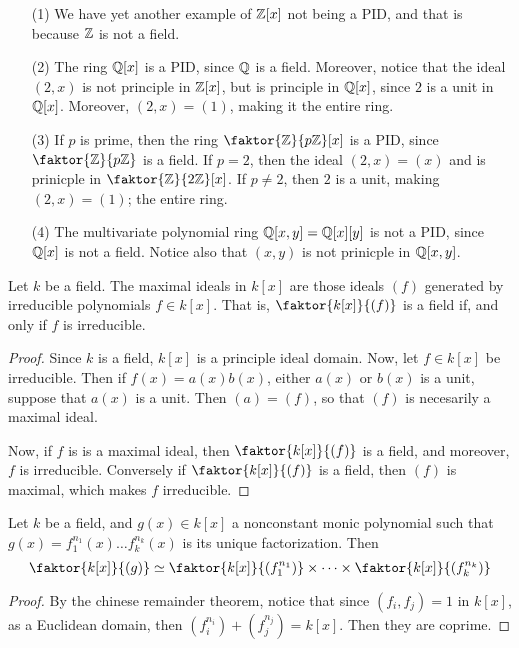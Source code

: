 \begin{example}\label{example_7.7}
  \begin{enumerate}
    \item[(1)] We have yet another example of $\mathbb{Z}[x]$ not being a PID, and
      that is because $\mathbb{Z}$ is not a field.

    \item[(2)] The ring $\mathbb{Q}[x]$ is a PID, since $\mathbb{Q}$ is a field. Moreover,
      notice that the ideal $(2,x)$ is not principle in $\mathbb{Z}[x]$, but is
      principle in $\mathbb{Q}[x]$, since $2$ is a unit in  $\mathbb{Q}[x]$. Moreover,
      $(2,x)=(1)$, making it the entire ring.

    \item[(3)] If $p$ is prime, then the ring  $\faktor{\Z}{p\Z}[x]$ is a
      PID, since $\faktor{\Z}{p\Z}$ is a field. If $p=2$, then the ideal
      $(2,x)=(x)$ and is prinicple in $\faktor{\Z}{2\Z}[x]$. If $p \neq 2$,
      then  $2$ is a unit, making  $(2,x)=(1)$; the entire ring.

    \item[(4)] The multivariate polynomial ring $\mathbb{Q}[x,y]=\mathbb{Q}[x][y]$ is not a
      PID, since $\mathbb{Q}[x]$ is not a field. Notice also that $(x,y)$ is not
      prinicple in $\mathbb{Q}[x,y]$.
  \end{enumerate}
\end{example}

\begin{lemma}\label{lemma_7.4.2}
  Let $k$ be a field. The maximal ideals in $k[x]$ are those ideals $(f)$
  generated by irreducible polynomials $f \in k[x]$. That is,
  $\faktor{k[x]}{(f)}$ is a field if, and only if $f$ is irreducible.
\end{lemma}
\begin{proof}
  Since $k$ is a field, $k[x]$ is a principle ideal domain. Now, let
  $f \in k[x]$ be irreducible. Then if $f(x)=a(x)b(x)$, either
  $a(x)$ or $b(x)$ is a unit, suppose that $a(x)$ is a unit. Then
  $(a)=(f)$, so that $(f)$ is necesarily a maximal ideal.

  Now, if $f$ is is a maximal ideal, then $\faktor{k[x]}{(f)}$ is a
  field, and moreover, $f$ is irreducible. Conversely if
  $\faktor{k[x]}{(f)}$ is a field, then $(f)$ is maximal, which makes
  $f$ irreducible.
\end{proof}

\begin{lemma}\label{lemma_7.4.4}
  Let $k$ be a field, and  $g(x) \in k[x]$ a nonconstant monic polynomial such
  that $g(x)=f_1^{n_1}(x) \dots f_k^{n_k}(x)$ is its unique factorization.
  Then
  \begin{equation*}
    \faktor{k[x]}{(g)} \simeq \faktor{k[x]}{(f_1^{n_1})} \times
    \dots \times \faktor{k[x]}{(f_k^{n_k})}
  \end{equation*}
\end{lemma}
\begin{proof}
  By the chinese remainder theorem, notice that since $(f_i,f_j)=1$ in $k[x]$,
  as a Euclidean domain, then $(f_i^{n_i})+(f_j^{n_j})=k[x]$. Then they are
  coprime.
\end{proof}

